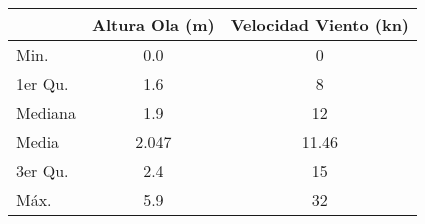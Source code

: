 \begin{tabular}{lS[table-format=1.3]S[table-format=2.3]}
    \toprule
    & {Altura Ola (\si{\meter})} & {Velocidad Viento (\si{\knot})} \\
    \midrule
    Min.    &0.0      &  0    \\
    1er Qu.  &1.6    &  8    \\
    Mediana &1.9    & 12    \\
    Media   &2.047  & 11.46 \\
    3er Qu.  &2.4    & 15    \\
    Máx.    &5.9    & 32    \\
    \bottomrule
\end{tabular}
